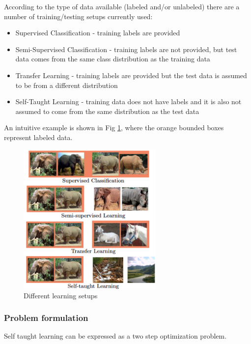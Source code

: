 \documentclass[10pt,journal,a4paper]{IEEEtran}
\begin{document}
According to the type of data available (labeled and/or unlabeled) there are a number of training/testing setups currently used:
\begin{itemize}
\item Supervised Classification - training labels are provided
\item Semi-Supervised Classification - training labels are not provided, but test data comes from the same class distribution as the training data
\item Transfer Learning - training labels are provided but the test data is assumed to be from a different distribution
\item Self-Taught Learning - training data does not have labels and it is also not assumed to come from the same distribution as the test data
\end{itemize}
An intuitive example is shown in Fig \ref{fig_sim}, where the orange bounded boxes represent labeled data.
\begin{figure}[!t]
\centering
\includegraphics[width=2.8in]{selftaught.png}
\caption{Different learning setups}
\label{fig_sim}
\end{figure}


\subsubsection{Problem formulation}
Self taught learning can be expressed as a two step optimization problem.
\end{document}
